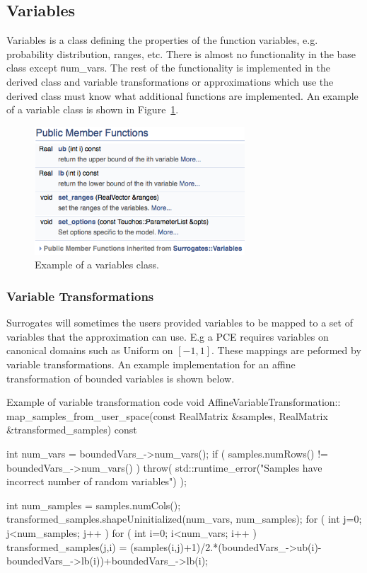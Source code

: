 \documentclass[dakotalogo]{dakota-article}
\begin{document}
\subsection{Variables}
Variables is a class defining the properties of the function variables, e.g. probability distribution, ranges, etc. There is almost no functionality in the base class except {\texttt num\_vars}. The rest of the functionality is implemented in the derived class and variable transformations or approximations which use the derived class must know what additional functions are implemented. An example of a variable class is shown in Figure~\ref{fig:bounded-vars-class}. 

\begin{figure}[htb]\centering
\includegraphics[width=0.7\textwidth]{bounded-vars-members.png}
\caption{Example of a variables class.}
\label{fig:bounded-vars-class}
\end{figure}  

\subsubsection{Variable Transformations}
Surrogates will sometimes the users provided variables to be mapped to a set of variables that the approximation can use. E.g a PCE requires variables on canonical domains such as Uniform on $[-1,1]$. These mappings are peformed by variable transformations. An example implementation for an affine transformation of bounded variables is shown below.
\begin{codelisting}{Example of variable transformation code}
void AffineVariableTransformation::
map_samples_from_user_space(const RealMatrix &samples, 
RealMatrix &transformed_samples) const {
  int num_vars = boundedVars_->num_vars();
  if ( samples.numRows() != boundedVars_->num_vars() )
    throw( std::runtime_error("Samples have incorrect number of random variables") );

  int num_samples = samples.numCols();
  transformed_samples.shapeUninitialized(num_vars, num_samples);
  for ( int j=0; j<num_samples; j++ ){
    for ( int i=0; i<num_vars; i++ ){
      transformed_samples(j,i) =
	(samples(i,j)+1)/2.*(boundedVars_->ub(i)-boundedVars_->lb(i))+boundedVars_->lb(i);
    }
  }
}
\end{codelisting}
\end{document}
